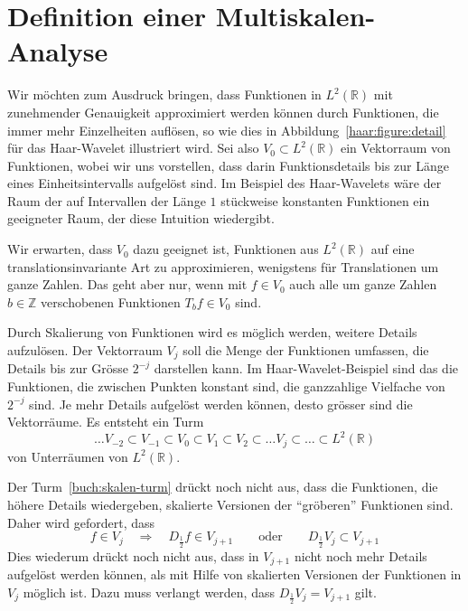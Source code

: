 %
%
%
\section{Definition einer Multiskalen-Analyse
\label{section:skalen und vektorraeume}}
Wir möchten zum Ausdruck bringen, dass Funktionen in $L^2(\mathbb R)$
mit zunehmender Genauigkeit approximiert werden können durch Funktionen,
die immer mehr Einzelheiten auflösen, so wie dies in
Abbildung~\ref{haar:figure:detail} für das Haar-Wavelet illustriert wird.
Sei also $V_0\subset L^2(\mathbb R)$ ein Vektorraum von Funktionen, wobei wir
uns vorstellen, dass darin Funktionsdetails bis zur Länge eines
Einheitsintervalls aufgelöst sind.
Im Beispiel des Haar-Wavelets wäre der Raum der auf Intervallen der Länge
$1$ stückweise konstanten Funktionen ein geeigneter Raum,
der diese Intuition wiedergibt.

Wir erwarten, dass $V_0$ dazu geeignet ist, Funktionen aus $L^2(\mathbb R)$
auf eine translationsinvariante Art zu approximieren, wenigstens
für Translationen um ganze Zahlen.
Das geht aber nur, wenn mit $f\in V_0$ auch alle um ganze
Zahlen $b\in\mathbb Z$ verschobenen Funktionen $T_bf\in V_0$ sind.

Durch Skalierung von Funktionen wird es möglich werden, weitere Details
aufzulösen.
Der Vektorraum $V_j$ soll die Menge der Funktionen umfassen, die Details
bis zur Grösse $2^{-j}$ darstellen kann.
Im Haar-Wavelet-Beispiel sind das die Funktionen, die zwischen Punkten
konstant sind, die ganzzahlige Vielfache von $2^{-j}$ sind.
Je mehr Details aufgelöst werden können, desto grösser sind die
Vektorräume.
Es entsteht ein Turm
\begin{equation}
\dots
V_{-2}\subset
V_{-1}\subset
V_0\subset
V_1\subset
V_2\subset
\dots
V_j\subset
\dots
\subset L^2(\mathbb R)
\label{buch:skalen-turm}
\end{equation}
von Unterräumen von $L^2(\mathbb R)$.

Der Turm~\eqref{buch:skalen-turm} drückt noch nicht aus, dass die
Funktionen, die höhere Details wiedergeben, skalierte Versionen der
``gröberen'' Funktionen sind.
Daher wird gefordert, dass
\[
f\in V_j \quad\Rightarrow\quad D_{\frac12}f\in V_{j+1}
\qquad\text{oder}\qquad
D_{\frac12}V_j \subset V_{j+1}
\]
Dies wiederum drückt noch nicht aus, dass in $V_{j+1}$ nicht noch mehr
Details aufgelöst werden können, als mit Hilfe von skalierten Versionen der
Funktionen in $V_j$ möglich ist.
Dazu muss verlangt werden, dass
$D_{\frac12}V_j = V_{j+1}$
gilt.

